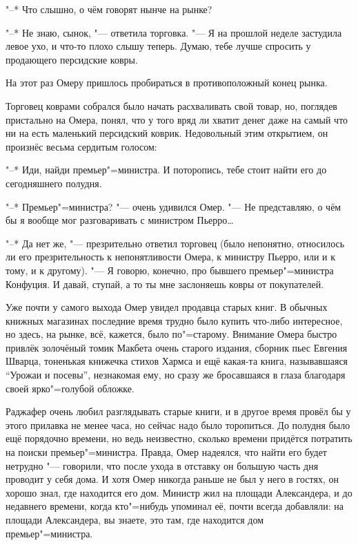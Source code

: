 "--* Что слышно, о чём говорят нынче на рынке?

"--* Не знаю, сынок, "--- ответила торговка.
"--- Я на прошлой неделе застудила левое ухо, и что-то плохо слышу теперь.
Думаю, тебе лучше спросить у продающего персидские ковры.

На этот раз Омеру пришлось пробираться в противоположный конец рынка.

Торговец коврами собрался было начать расхваливать свой товар, но, поглядев
пристально на Омера, понял, что у того вряд ли хватит денег даже на самый что ни
на есть маленький персидский коврик.
Недовольный этим открытием, он произнёс весьма сердитым голосом:

"--* Иди, найди премьер"=министра.
И поторопись, тебе стоит найти его до сегодняшнего полудня.

"--* Премьер"=министра? "--- очень удивился Омер.
"--- Не представляю, о чём бы я вообще мог разговаривать с министром
Пьерро\ldots

"--* Да нет же, "--- презрительно ответил торговец (было непонятно, относилось
ли его презрительность к непонятливости Омера, к министру Пьерро, или и к тому,
и к другому).
"--- Я говорю, конечно, про бывшего премьер"=министра Конфуция.
И давай, ступай, а то ты мне заслоняешь ковры от покупателей.

Уже почти у самого выхода Омер увидел продавца старых книг.
В обычных книжных магазинах последние время трудно было купить что-либо
интересное, но здесь, на рынке, всё, кажется, было по"=старому.
Внимание Омера быстро привлёк золочёный томик Макбета очень старого издания,
сборник пьес Евгения Шварца, тоненькая книжечка стихов Хармса и ещё какая-та
книга, называвшаяся \enquote{Урожаи и посевы}, незнакомая ему, но сразу же
бросавшаяся в глаза благодаря своей ярко"=голубой обложке.

Раджафер очень любил разглядывать старые книги, и в другое время провёл бы у
этого прилавка не менее часа, но сейчас надо было торопиться.
До полудня было ещё порядочно времени, но ведь неизвестно, сколько времени
придётся потратить на поиски премьер"=министра.
Правда, Омер надеялся, что найти его будет нетрудно "--- говорили, что после
ухода в отставку он большую часть дня проводит у себя дома.
И хотя Омер никогда раньше не был у него в гостях, он хорошо знал, где находится
его дом.
Министр жил на площади Александера, и до недавнего времени, когда кто"=нибудь
упоминал её, почти всегда добавляли: на площади Александера, вы знаете, это там,
где находится дом премьер"=министра.

